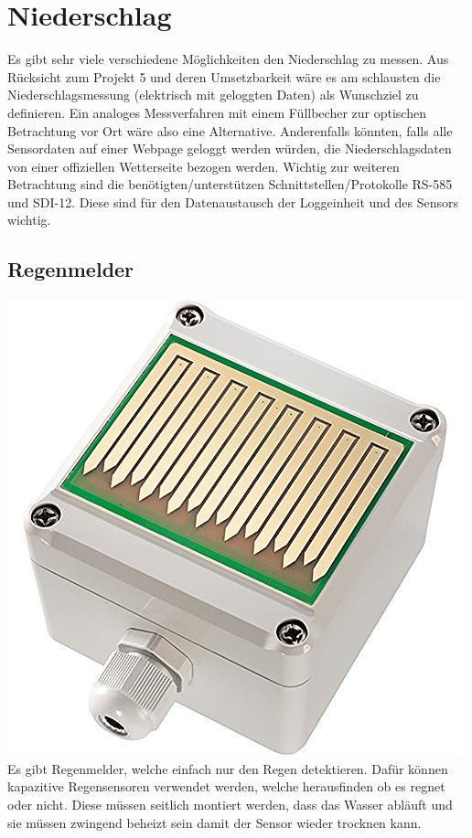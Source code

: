 \section{Niederschlag}
Es gibt sehr viele verschiedene Möglichkeiten den Niederschlag zu messen. Aus Rücksicht zum Projekt 5 und deren Umsetzbarkeit wäre es am schlausten die Niederschlagsmessung (elektrisch mit geloggten Daten) als Wunschziel zu definieren. Ein analoges Messverfahren mit einem Füllbecher zur optischen Betrachtung vor Ort wäre also eine Alternative. Anderenfalls könnten, falls alle Sensordaten auf einer Webpage geloggt werden würden, die Niederschlagsdaten von einer offiziellen Wetterseite bezogen werden. Wichtig zur weiteren Betrachtung sind die benötigten/unterstützen Schnittstellen/Protokolle RS-585 und SDI-12. Diese sind für den Datenaustausch der Loggeinheit und des Sensors wichtig.
\subsection{Regenmelder}
\begin{multicols}{2}
{ \centering
\includegraphics[width=0.4\columnwidth]{graphics/regenmelder.jpg}\\
\label{regenmelder}
}
\columnbreak
Es gibt Regenmelder, welche einfach nur den Regen detektieren. Dafür können kapazitive Regensensoren verwendet werden, welche herausfinden ob es regnet oder nicht. Diese müssen seitlich montiert werden, dass das Wasser abläuft und sie müssen zwingend beheizt sein damit der Sensor wieder trocknen kann.
\end{multicols}

